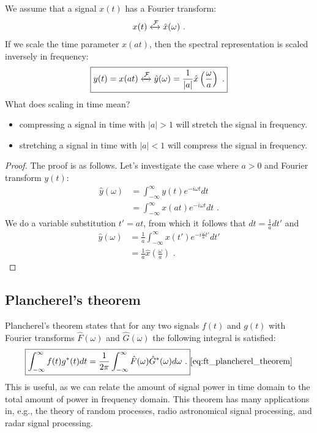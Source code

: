 We assume that a signal $x(t)$ has a Fourier transform:
\begin{align}
x(t) \xleftrightarrow{\mathcal{F}} \hat{x}(\omega)\,\,.
\end{align}
If we scale the time parameter $x(at)$, then the spectral representation is scaled inversely in frequency:
\begin{align}
\boxed{
  y(t) = x(at) \xleftrightarrow{\mathcal{F}} \hat{y}(\omega) = \frac{1}{|a|}\hat{x}\left(\frac{\omega}{a}\right)\,\,.
  \label{eq:timescale_ft_pair}
}
\end{align}
What does scaling in time mean?
\begin{itemize}
\item compressing a signal in time with $|a|>1$ will stretch the signal in frequency.
\item stretching a signal in time with $|a|<1$ will compress the signal in frequency. 
\end{itemize}
\begin{proof}
The proof is as follows. Let's investigate the case where $a > 0$ and Fourier transform $y(t)$:
\begin{align}
\hat{y}(\omega) &= \int_{-\infty}^{\infty} y(t) e^{-i\omega t}dt\\
                &= \int_{-\infty}^{\infty} x(at) e^{-i\omega t}dt\,\,.
\end{align}
We do a variable substitution $t'=at$, from which it follows that $dt=\frac{1}{a}dt'$ and 
\begin{align}
\hat{y}(\omega) &= \frac{1}{a}\int_{-\infty}^{\infty} x(t') e^{-i\frac{\omega}{a} t' }dt'\\
 &= \frac{1}{a}\hat{x}\left(\frac{\omega}{a} \right)\,\,.
\end{align}
\end{proof}







\subsection{Plancherel's theorem}

Plancherel's theorem states that for any two signals $f(t)$ and $g(t)$ with Fourier transforms $\hat{F}(\omega)$ and $\hat{G}(\omega)$ the following integral is satisfied:
\begin{equation}
\boxed{
\int_{-\infty}^{\infty} f(t) g^*(t) dt = \frac{1}{2\pi} \int_{-\infty}^{\infty}  \hat{F}(\omega)\hat{G}^*(\omega) d\omega\,\,.
}
\ref{eq:ft_plancherel_theorem}
\end{equation}
This is useful, as we can relate the amount of signal power in time domain to the total amount of power in frequency domain. This theorem has many applications in, e.g., the 
theory of random processes, radio astronomical signal processing, and radar signal processing.


